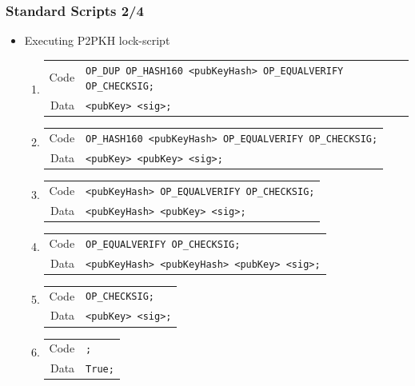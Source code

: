 \documentclass{beamer}
\begin{document}
\begin{frame}[fragile]
  \frametitle{Standard Scripts 2/4}
  \begin{itemize}
  \item Executing P2PKH lock-script
    \begin{enumerate}
    \item
      \begin{tabular}{rl}
        Code &\tiny\texttt{OP_DUP OP_HASH160 <pubKeyHash> OP_EQUALVERIFY OP_CHECKSIG;} \\
        Data &\tiny\texttt{<pubKey> <sig>;} \\
      \end{tabular}
    \item
      \begin{tabular}{rl}
        Code &\tiny\texttt{OP_HASH160 <pubKeyHash> OP_EQUALVERIFY OP_CHECKSIG;} \\
        Data &\tiny\texttt{<pubKey> <pubKey> <sig>;} \\
      \end{tabular}
    \item
      \begin{tabular}{rl}
        Code &\tiny\texttt{<pubKeyHash> OP_EQUALVERIFY OP_CHECKSIG;} \\
        Data &\tiny\texttt{<pubKeyHash> <pubKey> <sig>;} \\
      \end{tabular}
    \item
      \begin{tabular}{rl}
        Code &\tiny\texttt{OP_EQUALVERIFY OP_CHECKSIG;} \\
        Data &\tiny\texttt{<pubKeyHash> <pubKeyHash> <pubKey> <sig>;} \\
      \end{tabular}
    \item
      \begin{tabular}{rl}
        Code &\tiny\texttt{OP_CHECKSIG;} \\
        Data &\tiny\texttt{<pubKey> <sig>;} \\
      \end{tabular}
    \item
      \begin{tabular}{rl}
        Code &\tiny\texttt{;} \\
        Data &\tiny\texttt{True;} \\
      \end{tabular}
    \end{enumerate}
  \end{itemize}
\end{frame}
\end{document}
